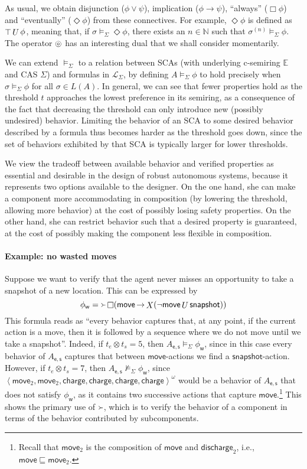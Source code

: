 \documentclass[a4paper]{article}
\newcommand{\naturals}{\mathbb{N}}
\newcommand{\angl}[1]{\left\langle#1\right\rangle}
\newcommand{\abscsemiring}{\mathbb{E}}
\newcommand{\composable}{\mathop{\ocircle}\nolimits}
\theoremstyle{definition}
\newcommand{\move}{\mathsf{move}}
\newcommand{\snapshot}{\mathsf{snapshot}}
\newcommand{\s}{\mathsf{s}}
\newcommand{\discharge}{\mathsf{discharge}}
\newcommand{\charge}{\mathsf{charge}}
\newcommand{\e}{\mathsf{e}}
\newcommand{\w}{\mathsf{w}}
\newcommand{\until}{\mathop{U}}
\newcommand{\nxt}{\mathop{X}\nolimits}
\newcommand{\eventually}{\mathop{\Diamond}}
\newcommand{\always}{\mathop{\Box}}
\newcommand{\true}{\raisebox{-0.08em}{\ensuremath{\top}}}
\newcommand{\captures}{\mathop{\Yright}}
\renewcommand{\implies}{\mathop{\rightarrow}}
\begin{document}
As usual, we obtain disjunction ($\phi \vee \psi$), implication ($\phi \implies \psi$), ``always'' ($\always \phi$) and ``eventually'' ($\eventually \phi$) from these connectives. For example, $\eventually \phi$ is defined as $\true \until \phi$, meaning that, if $\sigma \models_\Sigma \eventually \phi$, there exists an $n \in \naturals$ such that $\sigma^{(n)} \models_\Sigma \phi$. The operator $\composable$ has an interesting dual that we shall consider momentarily.

We can extend $\models_\Sigma$ to a relation between SCAs (with underlying c-semiring $\abscsemiring$ and CAS $\Sigma$) and formulas in $\mathcal{L}_\Sigma$, by defining $A \models_\Sigma \phi$ to hold precisely when $\sigma \models_\Sigma \phi$ for all $\sigma \in L(A)$. In general, we can see that fewer properties hold as the threshold $t$ approaches the lowest preference in its semiring, as a consequence of the fact that decreasing the threshold can only introduce new (possibly undesired) behavior. Limiting the behavior of an SCA to some desired behavior described by a formula thus becomes harder as the threshold goes down, since the set of behaviors exhibited by that SCA is typically larger for lower thresholds. 

We view the tradeoff between available behavior and verified properties as essential and desirable in the design of robust autonomous systems, because it represents two options available to the designer. On the one hand, she can make a component more accommodating in composition (by lowering the threshold, allowing more behavior) at the cost of possibly losing safety properties. On the other hand, she can restrict behavior such that a desired property is guaranteed, at the cost of possibly making the component less flexible in composition.

\paragraph{Example: no wasted moves}
Suppose we want to verify that the agent never misses an opportunity to take a snapshot of a new location. This can be expressed by
\[
\phi_\w = \captures \always (\move \implies \nxt (\neg \move \until \snapshot))
\]
This formula reads as ``every behavior captures that, at any point, if the current action is a move, then it is followed by a sequence where we do not move until we take a snapshot''. Indeed, if $t_e \otimes t_s = 5$, then $A_{\e, \s} \models_\Sigma \phi_\w$, since in this case every behavior of $A_{\e, \s}$ captures that between $\move$-actions we find a $\snapshot$-action. However, if $t_e \otimes t_s = 7$, then $A_{\e, \s} \not\models_\Sigma \phi_\w$, since $\angl{\move_2, \move_2, \charge, \charge, \charge, \charge}^\omega$ would be a behavior of $A_{\e, \s}$ that does not satisfy $\phi_\w$, as it contains two successive actions that capture $\move$.\footnote{Recall that $\move_2$ is the composition of $\move$ and $\discharge_2$, i.e., $\move \sqsubseteq \move_2$.} This shows the primary use of $\captures$, which is to verify the behavior of a component in terms of the behavior contributed by subcomponents.
\end{document}

